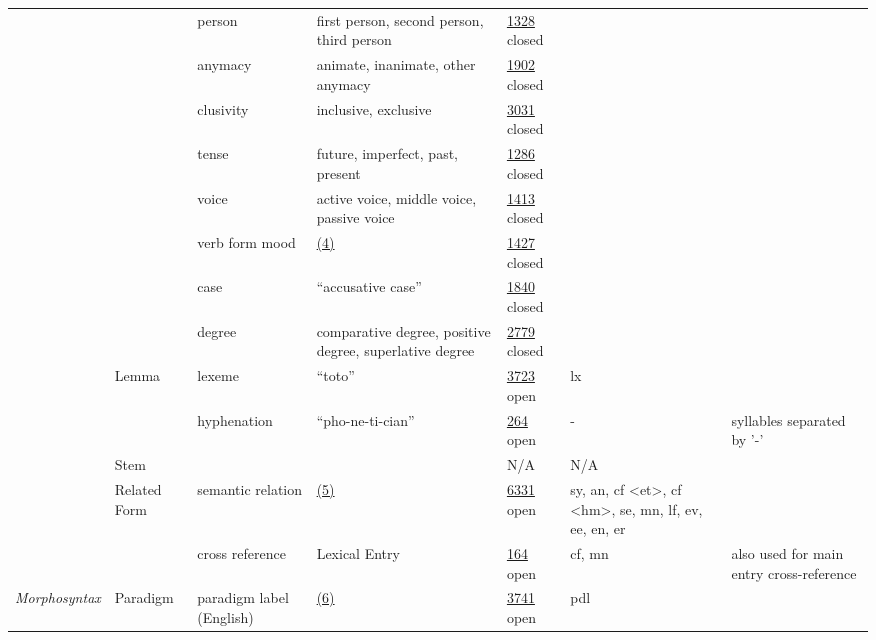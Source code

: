 \documentclass[a4paper,12pt]{article}
\begin{document}
\begin{center}
\begin{longtable}{*7{p{2cm}}}
& & person & first person, second person, third person & \href{http://www.isocat.org/datcat/DC-1328}{1328} closed & & \\ \cmidrule{3-7}
& & anymacy & animate, inanimate, other anymacy & \href{http://www.isocat.org/datcat/DC-1902}{1902} closed & & \\ \cmidrule{3-7}
& & clusivity & inclusive, exclusive & \href{http://www.isocat.org/datcat/DC-3031}{3031} closed & & \\ \cmidrule{3-7}
& & tense & future, imperfect, past, present & \href{http://www.isocat.org/datcat/DC-1286}{1286} closed & & \\ \cmidrule{3-7}
& & voice & active voice, middle voice, passive voice & \href{http://www.isocat.org/datcat/DC-1413}{1413} closed & & \\ \cmidrule{3-7}
& & verb form mood & \hyperlink{4}{(4)} \hypertarget{mood}{} & \href{http://www.isocat.org/datcat/DC-1427}{1427} closed & & \\ \cmidrule{3-7}
& & case & ``accusative case'' & \href{http://www.isocat.org/datcat/DC-1840}{1840} closed & & \\ \cmidrule{3-7}
& & degree & comparative degree, positive degree, superlative degree & \href{http://www.isocat.org/datcat/DC-2779}{2779} closed & & \\ \cmidrule{2-7}
& \multirow{2}{2cm}{Lemma} & lexeme & ``toto'' & \href{http://www.isocat.org/datcat/DC-3723}{3723} open & lx & \\ \cmidrule{3-7}
& & hyphenation & ``pho-ne-ti-cian'' & \href{http://www.isocat.org/datcat/DC-264}{264} open & - & syllables separated by '-' \\ \cmidrule{2-7}
& \multirow{1}{2cm}{Stem} & & & N/A & N/A & \\ \cmidrule{2-7}
& \multirow{2}{2cm}{Related Form} & semantic relation & \hyperlink{5}{(5)} \hypertarget{relation}{} & \href{http://www.isocat.org/datcat/DC-6331}{6331} open & sy, an, cf \textless et\textgreater, cf \textless hm\textgreater, se, mn, lf, ev, ee, en, er & \\ \cmidrule{3-7}
& & cross reference & Lexical Entry & \href{http://www.isocat.org/datcat/DC-164}{164} open & cf, mn & also used for main entry cross-reference \\ \cmidrule{1-7}
\multirow{5}{2cm}{\textit{Mor\-pho\-syn\-tax}} & \multirow{5}{2cm}{Paradigm} & paradigm label (English) & \hyperlink{6}{(6)} \hypertarget{paradigm}{} & \href{http://www.isocat.org/datcat/DC-3741}{3741} open & pdl & \\ \cmidrule{3-7}

\end{longtable}
\end{center}
\end{document}

